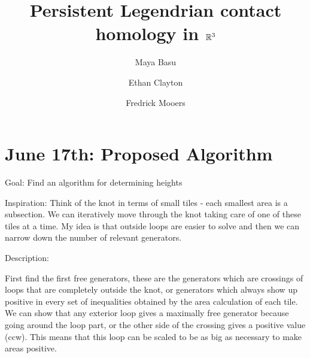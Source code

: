 \documentclass[11pt]{amsart}
\begin{document}
\author{Maya Basu}
\author{Ethan Clayton}
\author{Fredrick Mooers}

\address{University of California, Berkeley}

\address{University of Illinois, Urbana-Champaign}

\address{Virginia Tech}

\title{Persistent Legendrian contact homology in $\mathbb R^3$}




\maketitle

\tableofcontents
\newpage

\section{June 17th: Proposed Algorithm}
Goal: Find an algorithm for determining heights

Inspiration: Think of the knot in terms of small tiles - each smallest area is a subsection. We can iteratively move through the knot taking care of one of these tiles at a time. My idea is that outside loops are easier to solve and then we can narrow down the number of relevant generators.

Description:

First find the first free generators, these are the generators which are crossings of loops that are completely outside the knot, or generators which always show up positive in every set of inequalities obtained by the area calculation of each tile. We can show that any exterior loop gives a maximally free generator because going around the loop part, or the other side of the crossing gives a positive value (ccw). This means that this loop can be scaled to be as big as necessary to make areas positive.
\end{document}

